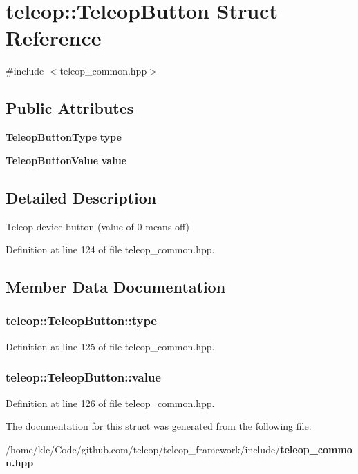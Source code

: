 \section{teleop::TeleopButton Struct Reference}
\label{structteleop_1_1TeleopButton}


{\ttfamily \#include $<$teleop\_\-common.hpp$>$}

\subsection*{Public Attributes}
\begin{DoxyCompactItemize}
\item 
{\bf TeleopButtonType} {\bf type}
\item 
{\bf TeleopButtonValue} {\bf value}
\end{DoxyCompactItemize}


\subsection{Detailed Description}
Teleop device button (value of 0 means off) 

Definition at line 124 of file teleop\_\-common.hpp.



\subsection{Member Data Documentation}
\subsubsection[{type}]{ {\bf teleop::TeleopButton::type}}\label{structteleop_1_1TeleopButton_ade22e95f36234e9a9e417adef318f92d}


Definition at line 125 of file teleop\_\-common.hpp.

\subsubsection[{value}]{ {\bf teleop::TeleopButton::value}}\label{structteleop_1_1TeleopButton_a945881d364a8344b61a6515d765e8531}


Definition at line 126 of file teleop\_\-common.hpp.



The documentation for this struct was generated from the following file:\begin{DoxyCompactItemize}
\item 
/home/klc/Code/github.com/teleop/teleop\_\-framework/include/{\bf teleop\_\-common.hpp}\end{DoxyCompactItemize}
